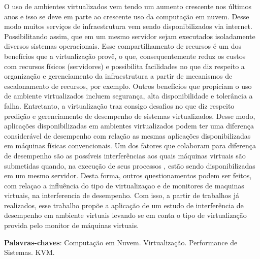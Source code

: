 \begin{resumo}
 O uso de ambientes virtualizados vem tendo um aumento crescente nos últimos anos e isso
se deve em parte ao crescente uso da computação em nuvem. Desse modo muitos serviços de infraestrutura vem sendo disponibilizados via internet. Possibilitando assim, que em um mesmo servidor sejam executados isoladamente diversos sistemas operacionais. Esse compartilhamento de recursos é um dos benefícios que a virtualização provê, o que, consequentemente reduz os custos com recursos físicos (servidores) e possibilita facilidades no que diz respeito a organização e gerenciamento da infraestrutura a partir de mecanismos de escalonamento de recursos, por exemplo. Outros benefícios que propiciam o uso de ambiente virtualizados incluem segurança, alta disponibilidade e tolerância a falha. Entretanto, a virtualização traz consigo desafios no que diz respeito predição e gerenciamento de desempenho de sistemas virtualizados. Desse modo, aplicações disponibilizadas em ambientes virtualizados podem ter uma diferença considerável de desempenho com relação as mesmas aplicações disponibilizadas em máquinas físicas convencionais. Um dos fatores que colaboram para diferença de desempenho são as possíveis interferências aos quais máquinas virtuais são submetidas quando, na execução de seus processos , estão sendo disponibilizadas em um mesmo servidor. Desta forma, outros questionamentos podem ser feitos, com relaçao a influência  do tipo de virtualizaçao e de monitores de maquinas virtuais, na interferencia de desempenho. Com isso, a partir de trabalhos já realizados, esse trabalho propõe a aplicação de um estudo de interferência de desempenho em ambiente virtuais levando se em conta o tipo de virtualização provida pelo monitor de máquinas virtuais. 





 \vspace{\onelineskip}
    
 \noindent
 \textbf{Palavras-chaves}: Computação em Nuvem. Virtualização. Performance de Sistemas. KVM.
\end{resumo}
